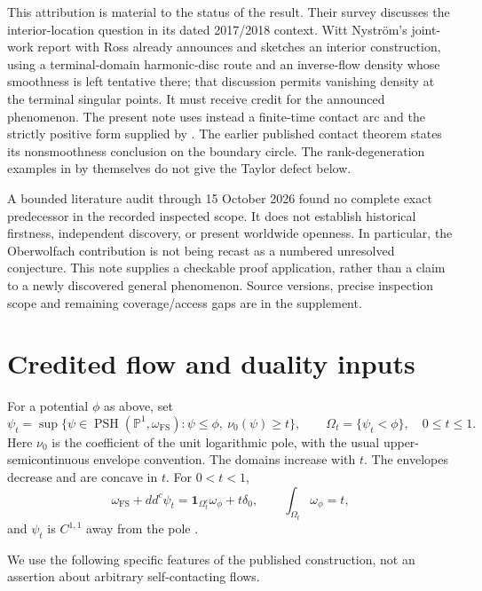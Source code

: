 \documentclass[11pt]{article}
\newcommand{\Pone}{\mathbb P^1}
\newcommand{\ddc}{dd^c}
\newcommand{\FS}{\omega_{\mathrm{FS}}}
\newcommand{\ind}{\mathbf 1}
\begin{document}
This attribution is material to the status of the result. Their survey
\cite[\S4.3]{survey} discusses the interior-location question in its dated
2017/2018 context. Witt Nystr\"om's joint-work report with Ross
\cite[pp.~1323--1324]{owr} already announces and sketches an interior
construction, using a terminal-domain harmonic-disc route and an inverse-flow
density whose smoothness is left tentative there; that discussion permits
vanishing density at the terminal singular points. It must receive credit
for the announced phenomenon. The present note uses instead a finite-time
contact arc and the strictly positive form supplied by
\cite[Proposition~3.4]{applications}. The earlier published contact theorem
\cite[Theorem~6.2]{applications} states its nonsmoothness conclusion on the
boundary circle. The rank-degeneration examples in \cite{rank} by themselves
do not give the Taylor defect below.

A bounded literature audit through 15 October 2026 found no complete exact
predecessor in the recorded inspected scope. It does not establish historical
firstness, independent discovery, or present worldwide openness. In particular,
the Oberwolfach contribution is not being recast as a numbered unresolved
conjecture. This note supplies a checkable proof application, rather than a
claim to a newly discovered general phenomenon. Source versions, precise
inspection scope and remaining coverage/access gaps are in the supplement.

\section{Credited flow and duality inputs}
For a potential $\phi$ as above, set
\[
 \psi_t=\sup\{\psi\in\operatorname{PSH}(\Pone,\FS):
            \psi\leq\phi,\ \nu_0(\psi)\geq t\},\qquad
 \Omega_t=\{\psi_t<\phi\},\quad 0\leq t\leq1.
\]
Here $\nu_0$ is the coefficient of the unit logarithmic pole, with the usual
upper-semicontinuous envelope convention. The domains increase with $t$.
The envelopes decrease and are concave in $t$. For $0<t<1$,
\begin{equation}\label{eq:current}
 \FS+\ddc\psi_t=\ind_{\Omega_t^c}\omega_\phi+t\delta_0,
 \qquad \int_{\Omega_t}\omega_\phi=t,
\end{equation}
and $\psi_t$ is $C^{1,1}$ away from the pole
\cite[Proposition~2.5]{applications}.

We use the following specific features of the published construction,
not an assertion about arbitrary self-contacting flows.
\end{document}
